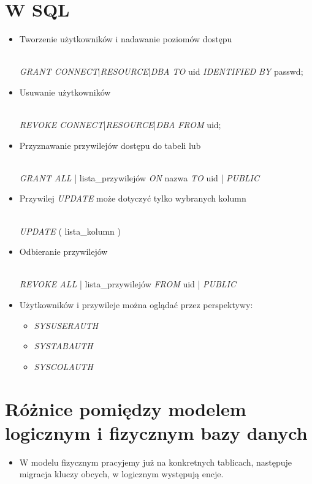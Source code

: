 \documentclass[a4paper,twoside]{article}
\begin{document}
  \section*{W SQL}
      \begin{itemize}
          \item Tworzenie użytkowników i nadawanie poziomów dostępu\\\\
          \centerline{\emph{GRANT CONNECT}|\emph{RESOURCE}|\emph{DBA TO} uid \emph{IDENTIFIED BY} passwd;}
          \item Usuwanie użytkowników\\\\ \centerline{\emph{REVOKE CONNECT}|\emph{RESOURCE}|\emph{DBA FROM} uid;}
          \item Przyznawanie przywilejów dostępu do tabeli lub\\\\ \centerline{\emph{GRANT ALL} | lista\_przywilejów \emph{ON} nazwa \emph{TO} uid | \emph{PUBLIC} }
          \item Przywilej \emph{UPDATE} może dotyczyć tylko wybranych kolumn\\\\ \centerline{\emph{UPDATE} ( lista\_kolumn ) }
          \item Odbieranie przywilejów\\\\ \centerline{\emph{REVOKE ALL} | lista\_przywilejów \emph{FROM} uid | \emph{PUBLIC}}
          \item Użytkowników i przywileje można oglądać przez perspektywy:
          \begin{itemize}
              \item \emph{SYSUSERAUTH}
              \item \emph{SYSTABAUTH}
              \item \emph{SYSCOLAUTH}
          \end{itemize}
      \end{itemize}

  \section*{Różnice pomiędzy modelem logicznym i fizycznym bazy danych}
      \begin{itemize}
      \item W modelu fizycznym pracyjemy już na konkretnych tablicach, następuje migracja kluczy obcych, w logicznym występują encje.
      \end{itemize}
\end{document}
